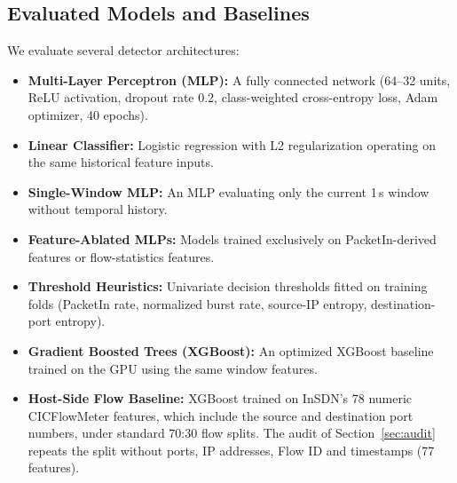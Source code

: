 \documentclass[journal]{IEEEtran}
\begin{document}
\subsection{Evaluated Models and Baselines}
We evaluate several detector architectures:
\begin{itemize}
    \item \textbf{Multi-Layer Perceptron (MLP):} A fully connected network (64--32 units, ReLU activation, dropout rate 0.2, class-weighted cross-entropy loss, Adam optimizer, 40 epochs).
    \item \textbf{Linear Classifier:} Logistic regression with L2 regularization operating on the same historical feature inputs.
    \item \textbf{Single-Window MLP:} An MLP evaluating only the current 1\,s window without temporal history.
    \item \textbf{Feature-Ablated MLPs:} Models trained exclusively on PacketIn-derived features or flow-statistics features.
    \item \textbf{Threshold Heuristics:} Univariate decision thresholds fitted on training folds (PacketIn rate, normalized burst rate, source-IP entropy, destination-port entropy).
    \item \textbf{Gradient Boosted Trees (XGBoost):} An optimized XGBoost baseline trained on the GPU using the same window features.
    \item \textbf{Host-Side Flow Baseline:} XGBoost trained on InSDN's 78 numeric CICFlowMeter features, which include the source and destination port numbers, under standard 70:30 flow splits. The audit of Section~\ref{sec:audit} repeats the split without ports, IP addresses, Flow ID and timestamps (77 features).
\end{itemize}
\end{document}
